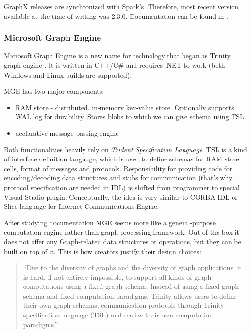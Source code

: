 
\noindent
GraphX releases are synchronized with Spark's. Therefore, most recent version available at the time of writing was 2.3.0. Documentation can be found in \cite{graphx-doc}.

\subsubsection{Microsoft Graph Engine}
Microsoft Graph Engine is a new name for technology that began as Trinity graph engine \cite{trinity-engine}. It is written in C++/C\# and requires .NET to work (both Windows and Linux builds are supported).

\noindent
MGE has two major components:
\begin{itemize}
    \item RAM store - distributed, in-memory key-value store. Optionally supports WAL log for durability. Stores blobs to which we can give schema using TSL.
    \item declarative message passing engine
\end{itemize}
Both functionalities heavily rely on \textit{Trident Specification Language}. TSL is a kind of interface definition language, which is used to define schemas for RAM store cells, format of messages and protocols. Responsibility for providing code for encoding/decoding data structures and stubs for communication (that's why protocol specification are needed in IDL) is shifted from programmer to special Visual Studio plugin. Conceptually, the idea is very similar to CORBA IDL or Slice language for Internet Communications Engine.

After studying documentation \cite{mge-website} MGE seems more like a general-purpose computation engine rather than graph processing framework. Out-of-the-box it does not offer any Graph-related data structures or operations, but they can be built on top of it. This is how creators justify their design choices:

\begin{quote}
``Due to the diversity of graphs and the diversity of graph applications, it is hard, if not entirely impossible, to support all kinds of graph computations using a fixed graph schema. Instead of using a fixed graph schema and fixed computation paradigms, Trinity allows users to define their own graph schemas, communication protocols through Trinity specification language (TSL) and realize their own computation paradigms.''
\end{quote}


